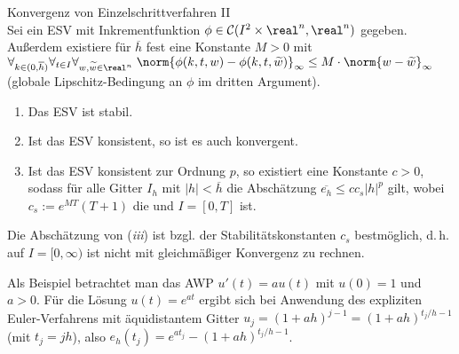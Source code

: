 \begin{Satz}{Konvergenz von Einzelschrittverfahren II}\\
    Sei ein ESV mit Inkrementfunktion
    $\phi \in \C(I^2 \times \real^n, \real^n)$ gegeben.
    Außerdem existiere für $\overline{h}$ fest eine Konstante $M > 0$ mit
    $\forall_{k \in (0, \overline{h})} \forall_{t \in I}
    \forall_{w, \widetilde{w} \in \real^n}\;
    \norm{\phi(k, t, w) - \phi(k, t, \widetilde{w})}_\infty \le
    M \cdot \norm{w - \widetilde{w}}_\infty$\\
    (globale Lipschitz-Bedingung an $\phi$ im dritten Argument).
    \begin{enumerate}[label=(\emph{\roman*})]
        \item
        Das ESV ist stabil.

        \item
        Ist das ESV konsistent, so ist es auch konvergent.

        \item
        Ist das ESV konsistent zur Ordnung $p$, so existiert eine
        Konstante $c > 0$, sodass für alle Gitter $I_h$ mit
        $|h| < \overline{h}$ die Abschätzung
        $\overline{e_h} \le c c_s |h|^p$ gilt, wobei
        $c_s := e^{MT} (T+1)$ die  und
        $I = [0, T]$ ist.
    \end{enumerate}
\end{Satz}

\begin{Bem}
    Die Abschätzung von (\emph{iii}) ist bzgl. der Stabilitätskonstanten $c_s$
    bestmöglich, d.\,h. auf $I = [0, \infty)$ ist nicht mit gleichmäßiger
    Konvergenz zu rechnen.
\end{Bem}

\begin{Bsp}
    Als Beispiel betrachtet man das AWP $u'(t) = a u(t)$ mit $u(0) = 1$ und
    $a > 0$.
    Für die Lösung $u(t) = e^{at}$ ergibt sich bei Anwendung des expliziten
    Euler-Verfahrens mit äquidistantem Gitter
    $u_j = (1 + ah)^{j-1} = (1 + ah)^{t_j/h - 1}$ (mit $t_j = jh$), also
    $e_h(t_j) = e^{a t_j} - (1 + ah)^{t_j/h - 1}$.
\end{Bsp}

